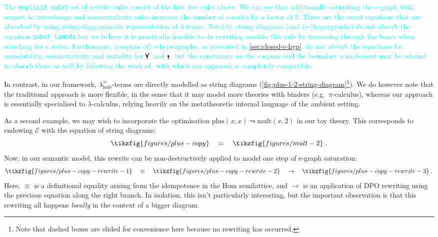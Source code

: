\textcolor{cyan}{The \texttt{explicit subst} set of rewrite rules consist of the first five rules above.
	We can see that additionally saturating the e-graph with respect to interchange and commutativity rules increases the number of e-nodes by a factor of 2.
	These are the exact equations that are absorbed by using string-diagrammatic representation of $\lambda$-terms.
	Notably, string diagrams (and (e-)hypergraphs) do not absorb the equation \texttt{subst\_lambda} but we believe it is practically feasible to do rewriting modulo this rule by traversing through the boxes when searching for a redex.
	Furthermore, (cospans of) e-hypergraphs, as presented in \autoref{sec:closed-e-hyp}, do not absorb the equations for associativity, commutativity and unitality for $\comonoid$ and $\counit$, but the constraints on the cospans and the boundary complement may be relaxed to absorb those as well by following the work of~\cite{zanassi_comonoid} with which our approach is completely compatible.}

In contrast, in our framework, $\lambda^\approx_{\text{lsub}}$-terms are directly modelled as string diagrams (\autoref{fig:plus-1-2-string-diagram}\footnote{Note that dashed boxes are elided for convenience here because no rewriting has occurred.}).
We do however note that the traditional approach is more flexible, in the sense that it may model more theories with binders (e.g.\ $\pi$-calculus), whereas our approach is essentially specialised to $\lambda$-calculus, relying heavily on the metatheoretic internal language of the ambient setting.

As a second example, we may wish to incorporate the optimisation ${\text{plus} (x, x) \leadsto \text{mult} (x, 2)}$ in our toy theory.
This corresponds to endowing $\mathcal{E}$ with the equation of string diagrams:
\[
	\tikzfig{figures/plus-copy}
	\quad
	=
	\quad
	\tikzfig{figures/mult-2}
	\;
	.
\]
Now, in our semantic model, this rewrite can be non-destructively applied to model one step of e-graph saturation:
\[
	\tikzfig{figures/plus-copy-rewrite-1}
	\quad
	\equiv
	\quad
	\tikzfig{figures/plus-copy-rewrite-2}
	\quad
	\to
	\quad
	\tikzfig{figures/plus-copy-rewrite-3}
	\;
	.
\]
Here, $\equiv$ is a definitional equality arising from the idempotence in the Hom semilattice, and $\to$ is an application of DPO rewriting using the previous equation along the right branch.
In isolation, this isn't particularly interesting, but the important observation is that this rewriting all happens \emph{locally} in the context of a bigger diagram.

